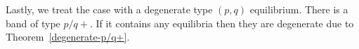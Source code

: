 \documentclass[12pt]{article}
\newcommand{\R}{\mathbb{R}}
\newcommand{\Z}{\mathbb{Z}}
\newcommand{\emark}{\hfill\hspace{1em}\framebox[0.5em]{\rule{0cm}{0em}}
\vspace{2mm}}
\newcommand{\refer}[1]{~(\ref{#1})}
\newcommand{\xbf}{{\mathbf{x}}}
\newcommand{\zero}{{\mathbf{0}}}
\newcommand{\mcalX}{\mathcal{X}}
\newcommand{\RSM}{\textcolor{red}}
\newcommand{\WQ}{\textcolor{blue}}
\begin{document}


Lastly, we treat the case with a degenerate type $(p,q)$ equilibrium.  There is a band of type $p/q+$.  %
 If it contains any equilibria then they are degenerate due to Theorem~\ref{degenerate-p/q+}.\emark
















\end{document}
